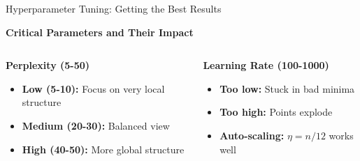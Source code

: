 \documentclass[10pt]{beamer}
\begin{document}
\begin{frame}{Hyperparameter Tuning: Getting the Best Results}

\begin{center}
\textbf{\large Critical Parameters and Their Impact}
\end{center}

\vspace{0.2cm}
\begin{columns}
\begin{column}{0.5\textwidth}
\textbf{Perplexity (5-50)}
\begin{itemize}
    \setlength\itemsep{0em}
    \item \textbf{Low (5-10):} Focus on very local structure
    \item \textbf{Medium (20-30):} Balanced view
    \item \textbf{High (40-50):} More global structure
\end{itemize}

\vspace{0.15cm}
\end{column}
\begin{column}{0.5\textwidth}
\textbf{Learning Rate (100-1000)}
\begin{itemize}
    \setlength\itemsep{0em}
    \item \textbf{Too low:} Stuck in bad minima
    \item \textbf{Too high:} Points explode
    \item \textbf{Auto-scaling:} $\eta = n/12$ works well
\end{itemize}


\end{column}
\end{columns}
\end{frame}
\end{document}
